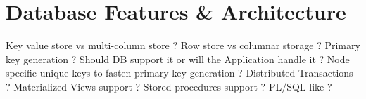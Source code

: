 \section{Database Features & Architecture}

Key value store vs multi-column store ?
Row store vs columnar storage ?
Primary key generation ? Should DB support it or will the Application handle it ?
Node specific unique keys to fasten primary key generation ?
Distributed Transactions ?
Materialized Views support ?
Stored procedures support ? PL/SQL like ?